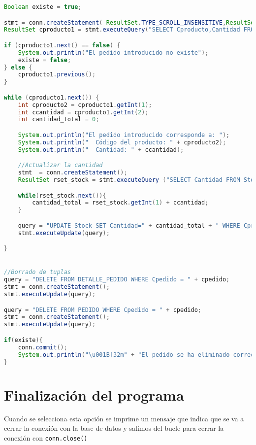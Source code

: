 \begin{lstlisting}[language=Java]
Boolean existe = true;

stmt = conn.createStatement( ResultSet.TYPE_SCROLL_INSENSITIVE,ResultSet.CONCUR_READ_ONLY);
ResultSet cproducto1 = stmt.executeQuery("SELECT Cproducto,Cantidad FROM Detalle_pedido WHERE Cpedido='"+ cpedido + "'");

if (cproducto1.next() == false) {
	System.out.println("El pedido introducido no existe");
	existe = false;
} else {
	cproducto1.previous();
}

while (cproducto1.next()) {
	int cproducto2 = cproducto1.getInt(1);
	int ccantidad = cproducto1.getInt(2);
	int cantidad_total = 0;

	System.out.println("El pedido introducido corresponde a: ");
	System.out.println("  Código del producto: " + cproducto2);
	System.out.println("  Cantidad: " + ccantidad);

	//Actualizar la cantidad
	stmt  = conn.createStatement();
	ResultSet rset_stock = stmt.executeQuery ("SELECT Cantidad FROM Stock WHERE Cproducto='" + cproducto2 + "'");

	while(rset_stock.next()){
		cantidad_total = rset_stock.getInt(1) + ccantidad;
	}

	query = "UPDATE Stock SET Cantidad=" + cantidad_total + " WHERE Cproducto='" + cproducto2+ "'";
	stmt.executeUpdate(query);

}


//Borrado de tuplas
query = "DELETE FROM DETALLE_PEDIDO WHERE Cpedido = " + cpedido;
stmt = conn.createStatement();
stmt.executeUpdate(query);

query = "DELETE FROM PEDIDO WHERE Cpedido = " + cpedido;
stmt = conn.createStatement();
stmt.executeUpdate(query);

if(existe){
	conn.commit();
	System.out.println("\u001B[32m" + "El pedido se ha eliminado correctamente" + "\u001B[0m");
}
\end{lstlisting}


\section{Finalización del programa}

Cuando se selecciona esta opción se imprime un mensaje que indica que se va a cerrar la conexión con la base de datos y salimos del bucle para cerrar la conexión con \texttt{conn.close()}
